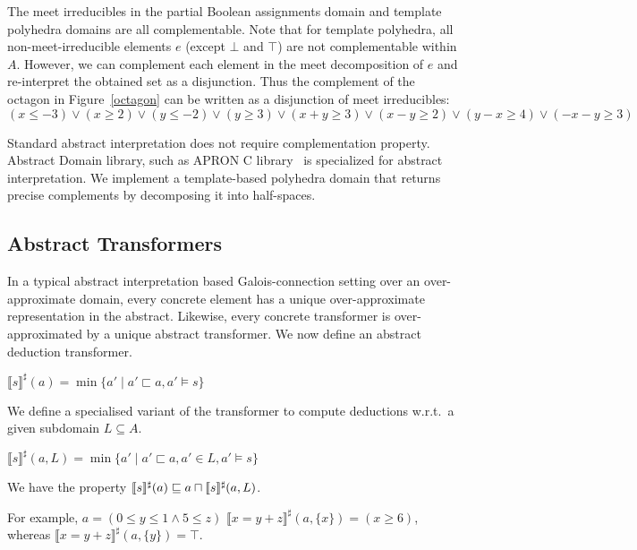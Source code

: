 The meet irreducibles in the partial Boolean assignments domain and
template polyhedra domains are all complementable.
%
Note that for template polyhedra, all non-meet-irreducible elements $e$
(except $\bot$ and $\top$) are not complementable within $A$.
%
However, we can complement each element in the meet decomposition of $e$ and
re-interpret the obtained set as a disjunction. 
%
Thus the complement of the octagon in Figure~\ref{octagon} 
can be written as a disjunction of meet irreducibles:
\[(x\leq -3) \lor (x\geq 2) \lor (y\leq -2) \lor (y\geq 3) \lor (x+y\geq 3) \lor (x-y\geq 2) \lor (y-x\geq 4) \lor (-x-y\geq 3)\]

Standard abstract interpretation does not require complementation property.  
Abstract Domain library, such as APRON C library~\cite{apron} is specialized 
for abstract interpretation.  We implement a template-based polyhedra domain 
that returns precise complements by decomposing it into half-spaces.    

\subsection{Abstract Transformers}
In a typical abstract interpretation based Galois-connection setting
over an over-approximate domain, every concrete element has a unique
over-approximate representation in the abstract.  Likewise, every
concrete transformer is over-approximated by a unique abstract
transformer.  We now define an abstract deduction transformer.

$\llbracket s \rrbracket^\sharp(a)=\min \{a'\mid a'\sqsubset a, a'\models s\}$


We define a specialised variant of the transformer to compute deductions w.r.t.\ a given subdomain $L\subseteq A$.

$\llbracket s \rrbracket^\sharp(a,L)=\min \{a'\mid a'\sqsubset a, a'\in L, a'\models s\}$

We have the property $\llbracket s \rrbracket^\sharp(a)\sqsubseteq a\sqcap\llbracket s \rrbracket^\sharp(a,L)$.

For example,
$a=(0\leq y \leq 1 \wedge 5\leq z)$
$\llbracket x=y+z\rrbracket^\sharp(a,\{x\})=(x\geq 6)$, whereas
$\llbracket x=y+z\rrbracket^\sharp(a,\{y\})=\top$.


